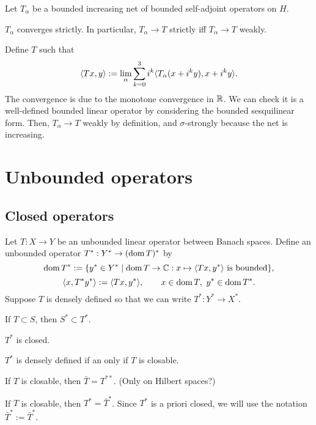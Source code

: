 \documentclass{../../large}
\begin{document}
\begin{prb}
Let $T_\alpha$ be a bounded increasing net of bounded self-adjoint operators on $H$.
\begin{parts}
\item $T_\alpha$ converges strictly. In particular, $T_\alpha\to T$ strictly iff $T_\alpha\to T$ weakly.
\end{parts}
\end{prb}
\begin{pf}
Define $T$ such that
\[\langle Tx,y\rangle:=\lim_\alpha\sum_{k=0}^3i^k\langle T_\alpha(x+i^ky),x+i^ky\rangle.\]
The convergence is due to the monotone convergence in $\mathbb{R}$.
We can check it is a well-defined bounded linear operator by considering the bounded sesquilinear form.
Then, $T_\alpha\to T$ weakly by definition, and $\sigma$-strongly because the net is increasing.
\end{pf}




\chapter{Unbounded operators}


\section{Closed operators}

\begin{prb}
\end{prb}

\begin{prb}
Let $T:X\to Y$ be an unbounded linear operator between Banach spaces.
Define an unbounded operator $T^*:Y^*\to(\operatorname{dom} T)^*$ by
\[\operatorname{dom} T^*:=\{y^*\in Y^*\mid \operatorname{dom} T\to\mathbb{C}:x\mapsto\langle Tx,y^*\rangle\text{ is bounded}\},\]
\[\langle x,T^*y^*\rangle:=\langle Tx,y^*\rangle,\qquad x\in\operatorname{dom} T,\ y^*\in\operatorname{dom} T^*.\]
Suppose $T$ is densely defined so that we can write $T^*:Y^*\to X^*$.
\begin{parts}
\item If $T\subset S$, then $S^*\subset T^*$.
\item $T^*$ is closed.
\item $T^*$ is densely defined if an only if $T$ is closable.
\item If $T$ is closable, then $\bar T=T^{**}$. (Only on Hilbert spaces?)
\item If $T$ is closable, then $T^*=\bar T^*$.
Since $T^*$ is a priori closed, we will use the notation $\bar T^*:={\bar T}^*$.
\end{parts}
\end{prb}
\end{document}
